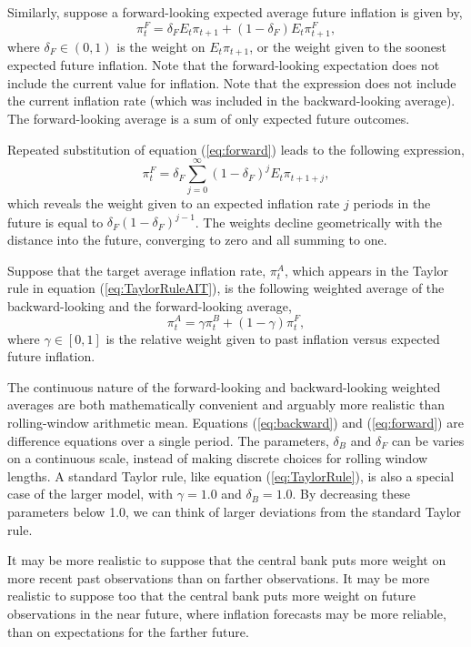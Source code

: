 \documentclass[english,authoryear,12pt]{elsarticle}
\begin{document}
Similarly, suppose a forward-looking expected average future inflation is given by,
\begin{equation}\label{eq:forward}
	\pi_t^F = \delta_F E_t \pi_{t+1} + (1-\delta_F) E_t \pi_{t+1}^F,
\end{equation}
where $\delta_F \in (0,1)$ is the weight on $E_t \pi_{t+1}$, or the weight given to the soonest expected future inflation. Note that the forward-looking expectation does not include the current value for inflation. Note that the expression does not include the current inflation rate (which was included in the backward-looking average). The forward-looking average is a sum of only expected future outcomes.

Repeated substitution of equation (\ref{eq:forward}) leads to the following expression,
\begin{equation}\label{eq:forward_all}
	\pi_t^F = \delta_F \sum_{j=0}^{\infty} (1-\delta_F)^j E_t \pi_{t+1+j},
\end{equation}
which reveals the weight given to an expected inflation rate $j$ periods in the future is equal to $\delta_F (1-\delta_F)^{j-1}$. The weights decline geometrically with the distance into the future, converging to zero and all summing to one.

Suppose that the target average inflation rate, $\pi_t^A$, which appears in the Taylor rule in equation (\ref{eq:TaylorRuleAIT}), is the following weighted average of the backward-looking and the forward-looking average,
\begin{equation}
	\pi_t^A = \gamma \pi_t^B + (1-\gamma) \pi_t^F,
\end{equation}
where $\gamma \in [0,1]$ is the relative weight given to past inflation versus expected future inflation.

The continuous nature of the forward-looking and backward-looking weighted averages are both mathematically convenient and arguably more realistic than rolling-window arithmetic mean. Equations (\ref{eq:backward}) and (\ref{eq:forward}) are difference equations over a single period. The parameters, $\delta_B$ and $\delta_F$ can be varies on a continuous scale, instead of making discrete choices for rolling window lengths. A standard Taylor rule, like equation (\ref{eq:TaylorRule}), is also a special case of the larger model, with $\gamma=1.0$ and $\delta_B=1.0$. By decreasing these parameters below 1.0, we can think of larger deviations from the standard Taylor rule.

It may be more realistic to suppose that the central bank puts more weight on more recent past observations than on farther observations. It may be more realistic to suppose too that the central bank puts more weight on future observations in the near future, where inflation forecasts may be more reliable, than on expectations for the farther future.
\end{document}

